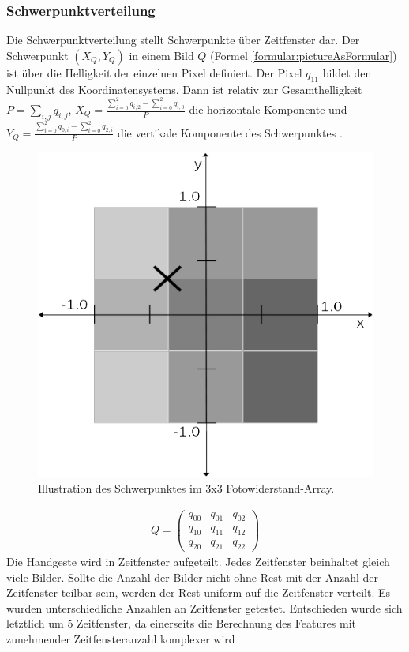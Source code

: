 \subsubsection{Schwerpunktverteilung}
\label{sec:schwerpunktverteilung}
Die Schwerpunktverteilung stellt Schwerpunkte über Zeitfenster dar. Der Schwerpunkt $(X_Q, Y_Q)$ in einem Bild $Q$ (Formel \ref{formular:pictureAsFormular}) ist über die Helligkeit der einzelnen
Pixel definiert. Der Pixel $q_{11}$ bildet den Nullpunkt des Koordinatensystems. Dann ist relativ zur Gesamthelligkeit $P = \sum_{i,j} q_{i,j}$, $X_Q=\frac{\sum_{i=0}^{2} q_{i,2} - \sum_{i=0}^{2} q_{i,0}}{P}$
die horizontale Komponente und $Y_Q = \frac{\sum_{i=0}^{2} q_{0,i} - \sum_{i=0}^{2} q_{2,i}}{P}$ die vertikale Komponente des Schwerpunktes \cite{schwerpunktAnsatz}.
\begin{figure}
    \centering
    \includegraphics[width=0.5\linewidth]{images/schwerpunkt_ansatz.jpg}
    \caption{Illustration des Schwerpunktes im 3x3 Fotowiderstand-Array.}
    \label{fig:schwerpunkt}
\end{figure}
\begin{align}
    Q = \begin{pmatrix}
            q_{00} & q_{01} & q_{02} \\
            q_{10} & q_{11} & q_{12} \\
            q_{20} & q_{21} & q_{22}
    \end{pmatrix}
    \label{formular:pictureAsFormular}
\end{align}
Die Handgeste wird in Zeitfenster aufgeteilt. Jedes Zeitfenster beinhaltet gleich viele Bilder. Sollte die Anzahl der Bilder nicht ohne Rest mit der Anzahl der Zeitfenster teilbar sein, werden der
Rest uniform auf die Zeitfenster verteilt.
\newline
\newline
Es wurden unterschiedliche Anzahlen an Zeitfenster getestet. Entschieden wurde sich letztlich um 5 Zeitfenster, da einerseits die Berechnung des Features mit zunehmender Zeitfensteranzahl komplexer wird

